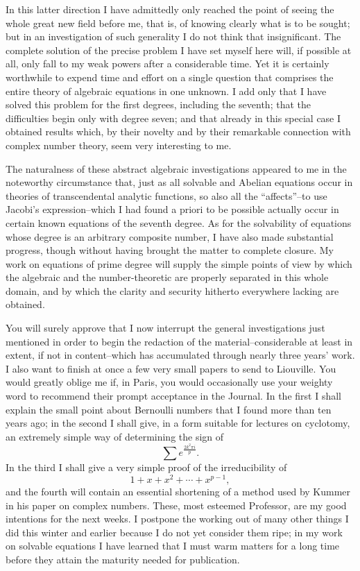 \documentclass[11pt]{article}
\begin{document}
In this latter direction I have admittedly only reached the point of seeing the whole great new field before me, that is, of knowing clearly what is to be sought; but in an investigation of such generality I do not think that insignificant. The complete solution of the precise problem I have set myself here will, if possible at all, only fall to my weak powers after a considerable time. Yet it is certainly worthwhile to expend time and effort on a single question that comprises the entire theory of algebraic equations in one unknown. I add only that I have solved this problem for the first degrees, including the seventh; that the difficulties begin only with degree seven; and that already in this special case I obtained results which, by their novelty and by their remarkable connection with complex number theory, seem very interesting to me.

The naturalness of these abstract algebraic investigations appeared to me in the noteworthy circumstance that, just as all solvable and Abelian equations occur in theories of transcendental analytic functions, so also all the ``affects''--to use Jacobi's expression--which I had found a priori to be possible actually occur in certain known equations of the seventh degree. As for the solvability of equations whose degree is an arbitrary composite number, I have also made substantial progress, though without having brought the matter to complete closure. My work on equations of prime degree will supply the simple points of view by which the algebraic and the number-theoretic are properly separated in this whole domain, and by which the clarity and security hitherto everywhere lacking are obtained.

You will surely approve that I now interrupt the general investigations just mentioned in order to begin the redaction of the material--considerable at least in extent, if not in content--which has accumulated through nearly three years' work. I also want to finish at once a few very small papers to send to Liouville. You would greatly oblige me if, in Paris, you would occasionally use your weighty word to recommend their prompt acceptance in the Journal. In the first I shall explain the small point about Bernoulli numbers that I found more than ten years ago; in the second I shall give, in a form suitable for lectures on cyclotomy, an extremely simple way of determining the sign of
\[
  \sum e^{\frac{2k^2\pi i}{p}} .
\]
In the third I shall give a very simple proof of the irreducibility of
\[
  1+x+x^2+\cdots+x^{p-1},
\]
and the fourth will contain an essential shortening of a method used by Kummer in his paper on complex numbers. These, most esteemed Professor, are my good intentions for the next weeks. I postpone the working out of many other things I did this winter and earlier because I do not yet consider them ripe; in my work on solvable equations I have learned that I must warm matters for a long time before they attain the maturity needed for publication.
\end{document}
